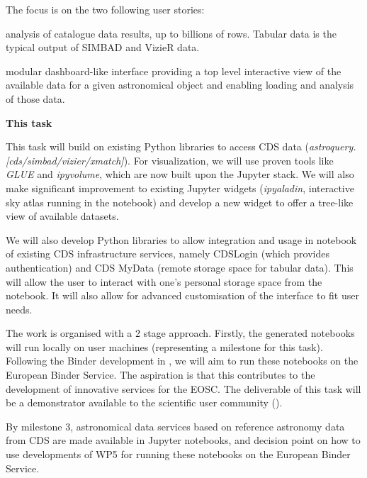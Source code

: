 \begin{task}[
  title=Astronomy application,
  id=astro,
  lead=CDS,
  PM=20,
  wphases={18-42},
  partners={EGI,INSERM,QS,SRL,WTT,XFEL}
]
  The focus is on the two following user stories:
    \begin{compactitem}
        \item analysis of catalogue data results, up to billions of rows.
              Tabular data is the typical output of SIMBAD and VizieR data.
        \item modular dashboard-like interface providing a top level
              interactive view of the available data for a given astronomical
              object and enabling loading and analysis of those data.
    \end{compactitem}


  \textbf{This task}

  This task will build on existing Python libraries to access CDS data
  (\textit{astroquery.[cds/simbad/vizier/xmatch]}). For visualization, we will
  use proven tools like \textit{GLUE} and \textit{ipyvolume}, which are now
  built upon the Jupyter stack.
  We will also make significant improvement to existing Jupyter widgets
  (\textit{ipyaladin}, interactive sky atlas running in the notebook) and
  develop a new widget to offer a tree-like view of available datasets.

  We will also develop Python libraries to allow integration and usage in
  notebook of existing CDS infrastructure services, namely CDSLogin (which
  provides authentication) and CDS MyData (remote storage space for tabular
  data).
  This will allow the user to interact with one's personal storage space from
  the notebook. It will also allow for advanced customisation of the interface
  to fit user needs.

  The work is organised with a 2 stage approach. Firstly, the generated
  notebooks will run locally on user machines (representing a milestone for
  this task). Following the Binder development in , we will aim
  to run these notebooks on the European Binder Service. The aspiration is
  that this contributes to the development of innovative services for the EOSC.
  The deliverable of this task will be a demonstrator available to the
  scientific user community ().

  By milestone 3, astronomical data services based on reference
  astronomy data from CDS are made available in Jupyter notebooks, and
  decision point on how to use developments of WP5 for running these
  notebooks on the European Binder Service.


\end{task}
